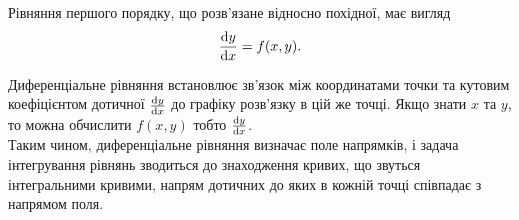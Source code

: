 Рівняння першого порядку, що розв'язане відносно похідної, має вигляд
\begin{equation*}
	\frac{\mathop{}\!\mathrm{d} y}{\mathop{}\!\mathrm{d} x} = f(x, y).	
\end{equation*}

Диференціальне рівняння встановлює зв'язок між координатами точки та кутовим коефіцієнтом дотичної $\frac{\mathop{}\!\mathrm{d} y}{\mathop{}\!\mathrm{d} x}$ до графіку розв'язку в цій же точці. Якщо знати $x$ та $y$, то можна обчислити $f(x, y)$ тобто $\frac{\mathop{}\!\mathrm{d} y}{\mathop{}\!\mathrm{d} x}$. \\

Таким чином, диференціальне рівняння визначає поле напрямків, і задача інтегрування рівнянь зводиться до знаходження кривих, що звуться інтегральними кривими, напрям дотичних до яких в кожній точці співпадає з напрямом поля.
